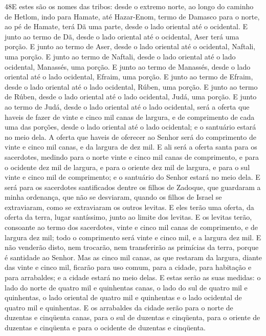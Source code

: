 \lettrine{48} E estes são os nomes das tribos: desde o extremo
norte, ao longo do caminho de Hetlom, indo para Hamate, até
Hazar-Enom, termo de Damasco para o norte, ao pé de Hamate, terá Dã
uma parte, desde o lado oriental até o ocidental. E junto ao
termo de Dã, desde o lado oriental até o ocidental, Aser terá uma
porção. E junto ao termo de Aser, desde o lado oriental até o
ocidental, Naftali, uma porção. E junto ao termo de Naftali,
desde o lado oriental até o lado ocidental, Manassés, uma porção.
E junto ao termo de Manassés, desde o lado oriental até o lado
ocidental, Efraim, uma porção. E junto ao termo de Efraim, desde
o lado oriental até o lado ocidental, Rúben, uma porção. E junto
ao termo de Rúben, desde o lado oriental até o lado ocidental, Judá,
uma porção. E junto ao termo de Judá, desde o lado oriental até
o lado ocidental, será a oferta que haveis de fazer de vinte e cinco
mil canas de largura, e de comprimento de cada uma das porções,
desde o lado oriental até o lado ocidental; e o santuário estará no
meio dela. A oferta que haveis de oferecer ao Senhor será do
comprimento de vinte e cinco mil canas, e da largura de dez mil.
E ali será a oferta santa para os sacerdotes, medindo para o
norte vinte e cinco mil canas de comprimento, e para o ocidente dez
mil de largura, e para o oriente dez mil de largura, e para o sul
vinte e cinco mil de comprimento; e o santuário do Senhor estará no
meio dela. E será para os sacerdotes santificados dentre os
filhos de Zadoque, que guardaram a minha ordenança, que não se
desviaram, quando os filhos de Israel se extraviaram, como se
extraviaram os outros levitas. E eles terão uma oferta, da
oferta da terra, lugar santíssimo, junto ao limite dos levitas.
E os levitas terão, consoante ao termo dos sacerdotes, vinte
e cinco mil canas de comprimento, e de largura dez mil; todo o
comprimento será vinte e cinco mil, e a largura dez mil. E
não venderão disto, nem trocarão, nem transferirão as primícias da
terra, porque é santidade ao Senhor. Mas as cinco mil canas,
as que restaram da largura, diante das vinte e cinco mil, ficarão
para uso comum, para a cidade, para habitação e para arrabaldes; e a
cidade estará no meio delas. E estas serão as suas medidas: o
lado do norte de quatro mil e quinhentas canas, o lado do sul de
quatro mil e quinhentas, o lado oriental de quatro mil e quinhentas
e o lado ocidental de quatro mil e quinhentas. E os
arrabaldes da cidade serão para o norte de duzentas e cinqüenta
canas, para o sul de duzentas e cinqüenta, para o oriente de
duzentas e cinqüenta e para o ocidente de duzentas e cinqüenta.
